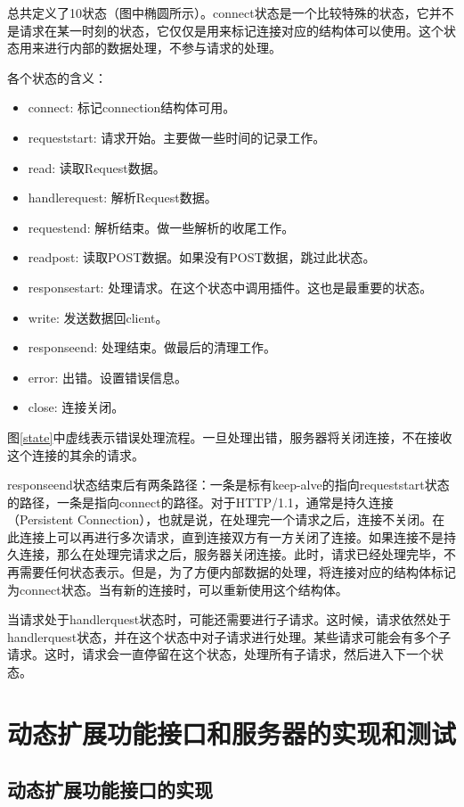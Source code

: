 \documentclass[12pt, twoside, a4paper, xetex]{report}
\begin{document}
	总共定义了10状态（图中椭圆所示）。connect状态是一个比较特殊的状态，它并不是请求在某一时刻的状态，它仅仅是用来标记连接对应的结构体可以使用。这个状态用来进行内部的数据处理，不参与请求的处理。
	
	各个状态的含义：
	\begin{itemize}
		\item connect: 标记connection结构体可用。
		\item requeststart: 请求开始。主要做一些时间的记录工作。
		\item read: 读取Request数据。
		\item handlerequest: 解析Request数据。
		\item requestend: 解析结束。做一些解析的收尾工作。
		\item readpost: 读取POST数据。如果没有POST数据，跳过此状态。
		\item responsestart: 处理请求。在这个状态中调用插件。这也是最重要的状态。
		\item write: 发送数据回client。
		\item responseend: 处理结束。做最后的清理工作。
		\item error: 出错。设置错误信息。
		\item close: 连接关闭。
	\end{itemize}
	
	图\ref{state}中虚线表示错误处理流程。一旦处理出错，服务器将关闭连接，不在接收这个连接的其余的请求。
	
	responseend状态结束后有两条路径：一条是标有keep-alve的指向requeststart状态的路径，一条是指向connect的路径。对于HTTP/1.1，通常是持久连接（Persistent Connection），也就是说，在处理完一个请求之后，连接不关闭。在此连接上可以再进行多次请求，直到连接双方有一方关闭了连接。如果连接不是持久连接，那么在处理完请求之后，服务器关闭连接。此时，请求已经处理完毕，不再需要任何状态表示。但是，为了方便内部数据的处理，将连接对应的结构体标记为connect状态。当有新的连接时，可以重新使用这个结构体。
	
	当请求处于handlerquest状态时，可能还需要进行子请求。这时候，请求依然处于handlerquest状态，并在这个状态中对子请求进行处理。某些请求可能会有多个子请求。这时，请求会一直停留在这个状态，处理所有子请求，然后进入下一个状态。
	
\chapter{动态扩展功能接口和服务器的实现和测试}

\section{动态扩展功能接口的实现}
\end{document}
